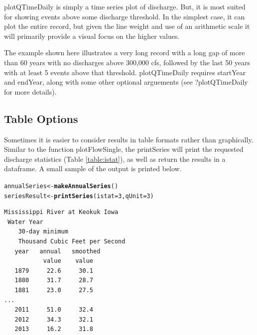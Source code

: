 \documentclass[a4paper,11pt]{article}\usepackage[]{graphicx}\usepackage[]{color}
\makeatletter
\newcommand{\hlnum}[1]{\textcolor[rgb]{0.686,0.059,0.569}{#1}}%
\newcommand{\hlstd}[1]{\textcolor[rgb]{0.345,0.345,0.345}{#1}}%
\newcommand{\hlkwb}[1]{\textcolor[rgb]{0.69,0.353,0.396}{#1}}%
\newcommand{\hlkwc}[1]{\textcolor[rgb]{0.333,0.667,0.333}{#1}}%
\newcommand{\hlkwd}[1]{\textcolor[rgb]{0.737,0.353,0.396}{\textbf{#1}}}%
\newenvironment{kframe}{%
 \def\at@end@of@kframe{}%
 \ifinner\ifhmode%
  \def\at@end@of@kframe{\end{minipage}}%
  \begin{minipage}{\columnwidth}%
 \fi\fi%
 \def\FrameCommand##1{\hskip\@totalleftmargin \hskip-\fboxsep
 \colorbox{shadecolor}{##1}\hskip-\fboxsep
     \hskip-\linewidth \hskip-\@totalleftmargin \hskip\columnwidth}%
 \MakeFramed {\advance\hsize-\width
   \@totalleftmargin\z@ \linewidth\hsize
   \@setminipage}}%
 {\par\unskip\endMakeFramed%
 \at@end@of@kframe}
\newenvironment{knitrout}{}{} %
\makeatother
\begin{document}
plotQTimeDaily is simply a time series plot of discharge.  But, it is most suited for showing events above some discharge threshold.  In the simplest case, it can plot the entire record, but given the line weight and use of an arithmetic scale it will primarily provide a visual focus on the higher values.

The example shown here illustrates a very long record with a long gap of more than 60 years with no discharges above 300,000 cfs, followed by the last 50 years with at least 5 events above that threshold. plotQTimeDaily requires startYear and endYear, along with some other optional arguements (see ?plotQTimeDaily for more details).

\FloatBarrier

\subsection{Table Options}
\label{sec:tableOptions}
Sometimes it is easier to consider results in table formats rather than graphically. Similar to the function plotFlowSingle, the printSeries will print the requested discharge statistics (Table \ref{table:istat}), as well as return the results in a dataframe. A small sample of the output is printed below.


\begin{knitrout}
\color{fgcolor}\begin{kframe}
\begin{alltt}
\hlstd{annualSeries}\hlkwb{<-}\hlkwd{makeAnnualSeries}\hlstd{()}
\hlstd{seriesResult} \hlkwb{<-} \hlkwd{printSeries}\hlstd{(}\hlkwc{istat}\hlstd{=}\hlnum{3}\hlstd{,} \hlkwc{qUnit}\hlstd{=}\hlnum{3}\hlstd{)}
\end{alltt}
\end{kframe}
\end{knitrout}


\begin{verbatim}
Mississippi River at Keokuk Iowa
 Water Year
    30-day minimum
    Thousand Cubic Feet per Second
   year   annual   smoothed
           value    value
   1879     22.6     30.1
   1880     31.7     28.7
   1881     23.0     27.5
...
   2011     51.0     32.4
   2012     34.3     32.1
   2013     16.2     31.8
\end{verbatim}
\end{document}
